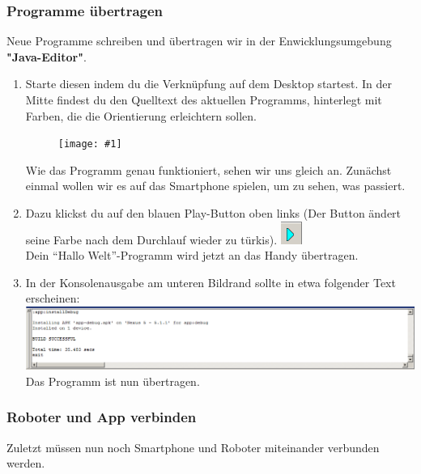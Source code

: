 \documentclass[
	12pt,
	article,
	type=bsc, %
	colorbacktitle,
	instlogo,
	accentcolor=tud1c,
	draft,
	german,
	twoside
]{tudexercise}
\newcommand{\gcenterone}[1]{
	\begin{figure}[h]
	\centering 
	\texttt{[image: \#1]}
	\end{figure}
}
\begin{document}
	\newpage
	
	
	\subsubsection{Programme übertragen}
	Neue Programme schreiben und übertragen wir in der	Enwicklungsumgebung \textbf{"Java-Editor"}.
	
	\begin{enumerate}
	\item Starte diesen indem du die Verknüpfung auf dem Desktop startest. In der Mitte findest du den Quelltext des aktuellen Programms, hinterlegt mit Farben, die die Orientierung erleichtern sollen.
	
	\gcenterone{img/je_main.png}
	
	Wie das Programm genau funktioniert, sehen wir uns gleich an. Zunächst einmal wollen wir es auf das Smartphone spielen, um zu sehen, was passiert.
	
	\item Dazu klickst du auf den blauen Play-Button oben links (Der Button ändert seine Farbe nach dem Durchlauf wieder zu türkis). 
	\includegraphics{img/je_playbutton.png} \\ Dein “Hallo Welt”-Programm wird jetzt an das Handy übertragen.
	
	\item In der Konsolenausgabe am unteren Bildrand sollte in etwa folgender Text erscheinen:
	\includegraphics[width=\textwidth]{img/je_console.png}
	Das Programm ist nun übertragen.
	\end{enumerate}
	\newpage
	\subsubsection{Roboter und App verbinden}
	Zuletzt müssen nun noch Smartphone und Roboter miteinander verbunden werden. 
	
\end{document}
